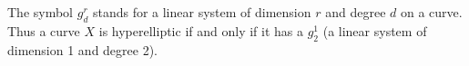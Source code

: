 The symbol $g_d^r$ stands for a linear system of dimension $r$ and degree $d$ on a curve. Thus a curve $X$ is hyperelliptic if and only if it has a $g_2^1$ (a linear system of dimension 1 and degree 2).
